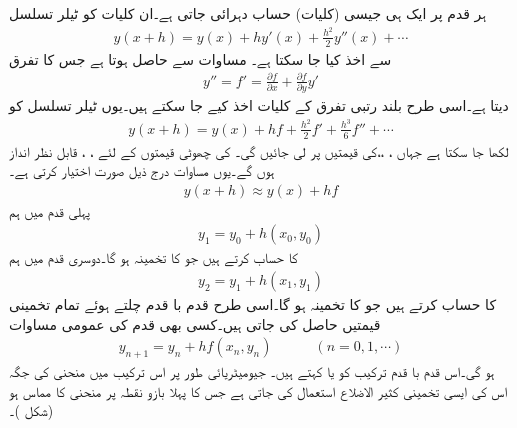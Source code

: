 ہر قدم پر ایک ہی جیسی (کلیات) حساب دہرائی جاتی ہے۔ان کلیات کو ٹیلر تسلسل
\begin{align*}
y(x+h)=y(x)+hy'(x)+\frac{h^2}{2}y''(x)+\cdots
\end{align*}
 سے اخذ کیا جا سکتا ہے۔ مساوات  سے  حاصل ہوتا ہے جس  کا تفرق
\begin{align*}
y''=f'=\tfrac{\partial f}{\partial x}+\tfrac{\partial f}{\partial y}y'
\end{align*}
دیتا ہے۔اسی طرح بلند رتبی تفرق کے کلیات اخذ کیے جا سکتے ہیں۔یوں ٹیلر تسلسل کو
\begin{align}\label{مساوات_اعدادی_ابتدائی_مسئلہ_ب}
y(x+h)=y(x)+hf+\frac{h^2}{2}f'+\frac{h^3}{6}f''+\cdots
\end{align}
لکھا جا سکتا ہے جہاں ، ،، کی قیمتیں  پر  لی جائیں گی۔ کی چھوٹی قیمتوں کے لئے ، ،  قابل نظر انداز ہوں گے۔یوں مساوات  درج ذیل صورت اختیار کرتی ہے۔
\begin{align*}
y(x+h)\approx y(x)+hf
\end{align*}
پہلی قدم میں ہم 
\begin{align*}
y_1=y_0+h(x_0,y_0)
\end{align*}
کا حساب کرتے ہیں جو  کا تخمینہ ہو گا۔دوسری قدم میں ہم
 \begin{align*}
y_2=y_1+h(x_1,y_1)
\end{align*}
کا حساب کرتے ہیں جو  کا تخمینہ ہو گا۔اسی طرح قدم با قدم چلتے ہوئے تمام تخمینی قیمتیں حاصل کی جاتی ہیں۔کسی بھی قدم کی عمومی مساوات
\begin{align}\label{مساوات_اعدادی_ابتدائی_مسئلہ_پ}
y_{n+1}=y_n+hf(x_n,y_n)\quad\quad\quad (n=0,1,\cdots)
\end{align}
ہو گی۔اس قدم با قدم ترکیب کو  یا  کہتے ہیں۔ جیومیٹریائی طور پر اس ترکیب میں  منحنی  کی جگہ اس کی ایسی تخمینی کثیر الاضلاع استعمال کی جاتی ہے جس کا پہلا بازو نقطہ  پر منحنی کا مماس ہو (شکل )۔
